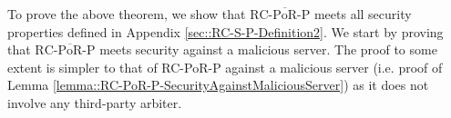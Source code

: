  To prove the above theorem, we show that ${\text{RC-}\overline{\text{PoR}}\text{-P}}$ meets all security properties defined in Appendix \ref{sec::RC-S-P-Definition2}.  We start by proving that ${\text{RC-}\overline{\text{PoR}}\text{-P}}$ meets security against a malicious server.   The proof to some extent is  simpler to that  of RC-PoR-P against a malicious server (i.e. proof of Lemma \ref{lemma::RC-PoR-P-SecurityAgainstMaliciousServer})  as it does not involve any third-party arbiter. 

 
 



%



